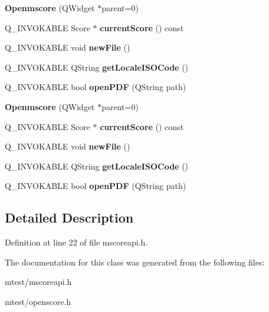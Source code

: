 \begin{DoxyCompactItemize}
\item 
\mbox{\label{class_openmscore_a36f75d8f91a7d28368f7b05bc95d3e7a}} 
{\bfseries Openmscore} (Q\+Widget $\ast$parent=0)
\item 
\mbox{\label{class_openmscore_a5cd987e332f19983a769609a3b4f10a4}} 
Q\+\_\+\+I\+N\+V\+O\+K\+A\+B\+LE Score $\ast$ {\bfseries current\+Score} () const
\item 
\mbox{\label{class_openmscore_ae954706715d673b11df3e8f2c6196015}} 
Q\+\_\+\+I\+N\+V\+O\+K\+A\+B\+LE void {\bfseries new\+File} ()
\item 
\mbox{\label{class_openmscore_ab9c951a40659ef2a81bac413f1a9776a}} 
Q\+\_\+\+I\+N\+V\+O\+K\+A\+B\+LE Q\+String {\bfseries get\+Locale\+I\+S\+O\+Code} ()
\item 
\mbox{\label{class_openmscore_a1db61e3de835ab6b4b9bee4021127d6c}} 
Q\+\_\+\+I\+N\+V\+O\+K\+A\+B\+LE bool {\bfseries open\+P\+DF} (Q\+String path)
\item 
\mbox{\label{class_openmscore_a36f75d8f91a7d28368f7b05bc95d3e7a}} 
{\bfseries Openmscore} (Q\+Widget $\ast$parent=0)
\item 
\mbox{\label{class_openmscore_a5cd987e332f19983a769609a3b4f10a4}} 
Q\+\_\+\+I\+N\+V\+O\+K\+A\+B\+LE Score $\ast$ {\bfseries current\+Score} () const
\item 
\mbox{\label{class_openmscore_ae954706715d673b11df3e8f2c6196015}} 
Q\+\_\+\+I\+N\+V\+O\+K\+A\+B\+LE void {\bfseries new\+File} ()
\item 
\mbox{\label{class_openmscore_ab9c951a40659ef2a81bac413f1a9776a}} 
Q\+\_\+\+I\+N\+V\+O\+K\+A\+B\+LE Q\+String {\bfseries get\+Locale\+I\+S\+O\+Code} ()
\item 
\mbox{\label{class_openmscore_a1db61e3de835ab6b4b9bee4021127d6c}} 
Q\+\_\+\+I\+N\+V\+O\+K\+A\+B\+LE bool {\bfseries open\+P\+DF} (Q\+String path)
\end{DoxyCompactItemize}


\subsection{Detailed Description}


Definition at line 22 of file mscoreapi.\+h.



The documentation for this class was generated from the following files\+:\begin{DoxyCompactItemize}
\item 
mtest/mscoreapi.\+h\item 
mtest/openscore.\+h\end{DoxyCompactItemize}
